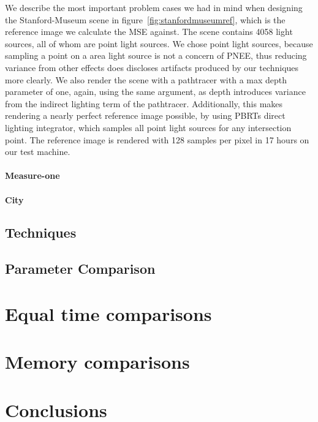 We describe the most important problem cases we had in mind when designing the Stanford-Museum scene in figure~\ref{fig:stanfordmuseumref}, which is the reference image we calculate the MSE against. The scene contains 4058 light sources, all of whom are point light sources. We chose point light sources, because sampling a point on a area light source is not a concern of PNEE, thus reducing variance from other effects does discloses artifacts produced by our techniques more clearly. We also render the scene with a pathtracer with a max depth parameter of one, again, using the same argument, as depth introduces variance from the indirect lighting term of the pathtracer. Additionally, this makes rendering a nearly perfect reference image possible, by using PBRTs direct lighting integrator, which samples all point light sources for any intersection point. The reference image is rendered with 128 samples per pixel in 17 hours on our test machine.

\paragraph{Measure-one}




\paragraph{City}




\subsection{Techniques}


\subsection{Parameter Comparison}




\label{ch:ev:photontree}


\label{ch:ev:cdftree}


\section{Equal time comparisons}

\section{Memory comparisons}

\section{Conclusions}
